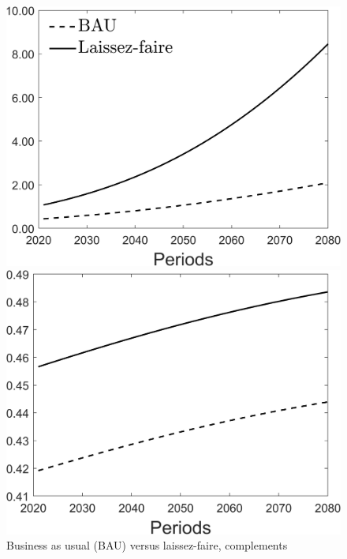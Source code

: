 \begin{figure}[h!!]
	\centering
	\caption{Business as usual (BAU) versus laissez-faire, complements }\label{fig:onlyBAU_comp}
	\begin{minipage}[]{0.32\textwidth}
		\includegraphics[width=1\textwidth]{../../codding_model/Own/figures/Rep_agent/staticBAU_LF_separate_c_periods59_eppsilon0.40_zeta1.40_Ad08_Ac04_thetac0.70_thetad0.56_HetGrowth1_tauul0.181_util0_withtarget0_lgd1.png}
	\end{minipage}
	\begin{minipage}[]{0.32\textwidth}
		\includegraphics[width=1\textwidth]{../../codding_model/Own/figures/Rep_agent/staticBAU_LF_separate_hh_periods59_eppsilon0.40_zeta1.40_Ad08_Ac04_thetac0.70_thetad0.56_HetGrowth1_tauul0.181_util0_withtarget0_lgd0.png}

\end{minipage}
\end{figure}
